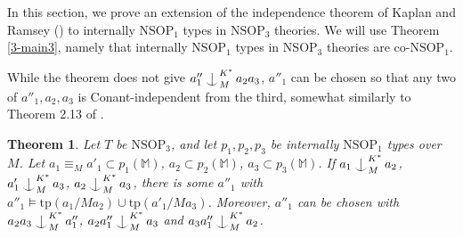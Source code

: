 \documentclass[12pt]{amsart}
\newtheorem{theorem}{Theorem}[section]
\theoremstyle{definition}
\def\Ind#1#2{#1\setbox0=\hbox{$#1x$}\kern\wd0\hbox to 0pt{\hss$#1\mid$\hss}
\lower.9\ht0\hbox to 0pt{\hss$#1\smile$\hss}\kern\wd0}
\def\ind{\mathop{\mathpalette\Ind{}}}
\begin{document}
In this section, we prove an extension of the independence theorem of Kaplan and Ramsey (\cite{KR17}) to internally $\mathrm{NSOP}_{1}$ types in $\mathrm{NSOP}_{3}$ theories. We will use Theorem \ref{3-main3}, namely that internally $\mathrm{NSOP}_{1}$ types in $\mathrm{NSOP}_{3}$ theories are co-$\mathrm{NSOP}_{1}$. 


While the theorem does not give $a_{1}'' \ind_{M}^{K^{*}} a_{2}a_{3}$, $a''_{1}$ can be chosen so that any two of $a''_{1}, a_{2}, a_{3}$ is Conant-independent from the third, somewhat similarly to Theorem 2.13 of \cite{KR18}. 

\begin{theorem} \label{4-main4}
    Let $T$ be $\mathrm{NSOP}_{3}$, and let $p_{1}, p_{2}, p_{3}$ be internally $\mathrm{NSOP}_{1}$ types over $M$. Let $a_{1} \equiv_{M} a'_{1} \subset p_{1}(\mathbb{M})$, $ a_{2} \subset p_{2}(\mathbb{M})$,  $ a_{3} \subset p_{3}(\mathbb{M})$.  If $a_{1} \ind^{K^{*}}_{M} a_{2}$, $a'_{1} \ind^{K^{*}}_{M} a_{3}$, $a_{2} \ind^{K^{*}}_{M} a_{3}$, there is some $a''_{1}$ with $a''_{1} \models \mathrm{tp}(a_{1}/Ma_{2}) \cup \mathrm{tp}(a'_{1}/Ma_{3})$. Moreover, $a''_{1}$ can be chosen with $a_{2}a_{3} \ind^{K^{*}}_{M}a''_{1}$, $a_{2}a''_{1} \ind^{K^{*}}_{M} a_{3}$ and $a_{3}a''_{1} \ind^{K^{*}}_{M} a_{2}$.
\end{theorem}

 
\end{document}
